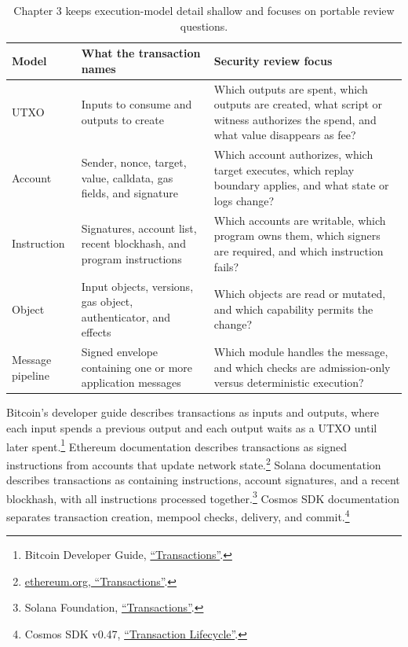 \begin{table}[htbp]
\centering
\small
\renewcommand{\arraystretch}{1.16}
\begin{tabularx}{\textwidth}{@{}>{\RaggedRight\arraybackslash}p{}>{\RaggedRight\arraybackslash}p{}X@{}}
\toprule
Model & What the transaction names & Security review focus \\
\midrule
UTXO & Inputs to consume and outputs to create & Which outputs are spent, which outputs are created, what script or witness authorizes the spend, and what value disappears as fee? \\
Account & Sender, nonce, target, value, calldata, gas fields, and signature & Which account authorizes, which target executes, which replay boundary applies, and what state or logs change? \\
Instruction & Signatures, account list, recent blockhash, and program instructions & Which accounts are writable, which program owns them, which signers are required, and which instruction fails? \\
Object & Input objects, versions, gas object, authenticator, and effects & Which objects are read or mutated, and which capability permits the change? \\
Message pipeline & Signed envelope containing one or more application messages & Which module handles the message, and which checks are admission-only versus deterministic execution? \\
\bottomrule
\end{tabularx}
\caption{Chapter 3 keeps execution-model detail shallow and focuses on portable review questions.}
\end{table}

Bitcoin's developer guide describes transactions as inputs and outputs, where each input spends a previous output and each output waits as a UTXO until later spent.\footnote{Bitcoin Developer Guide, \href{https://developer.bitcoin.org/devguide/transactions.html}{``Transactions''}.} Ethereum documentation describes transactions as signed instructions from accounts that update network state.\footnote{\href{https://ethereum.org/developers/docs/transactions/}{ethereum.org, ``Transactions''}.} Solana documentation describes transactions as containing instructions, account signatures, and a recent blockhash, with all instructions processed together.\footnote{Solana Foundation, \href{https://solana.com/docs/core/transactions}{``Transactions''}.} Cosmos SDK documentation separates transaction creation, mempool checks, delivery, and commit.\footnote{Cosmos SDK v0.47, \href{https://docs.cosmos.network/sdk/v0.47/learn/beginner/tx-lifecycle}{``Transaction Lifecycle''}.}

